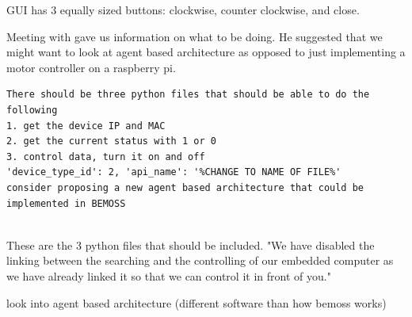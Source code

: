 \documentclass[fontsize=11pt, %
                             paper=letter, %
                             twoside, %
                             captions=tableheading,
                             index=totoc,
                             hyperref]{labbook}
\begin{document}
GUI has 3 equally sized buttons: clockwise, counter clockwise, and close. 


Meeting with gave us information on what to be doing. He suggested that we might want to look at agent based architecture as opposed to just implementing a motor controller on a raspberry pi.
\begin{verbatim}
There should be three python files that should be able to do the following
1. get the device IP and MAC
2. get the current status with 1 or 0
3. control data, turn it on and off
'device_type_id': 2, 'api_name': '%CHANGE TO NAME OF FILE%'
consider proposing a new agent based architecture that could be implemented in BEMOSS
    
\end{verbatim}
These are the 3 python files that should be included. 
"We have disabled the linking between the searching and the controlling of our embedded computer as we have already linked it so that we can control it in front of you."

look into agent based architecture (different software than how bemoss works) 
\end{document}
